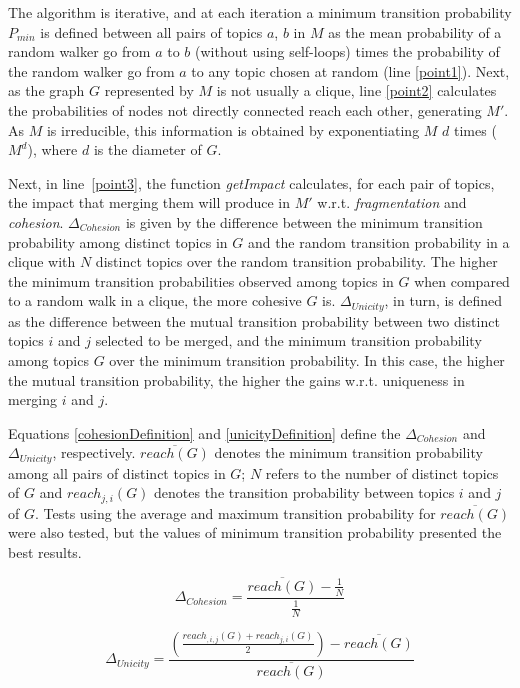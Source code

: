 The algorithm is iterative, and at each iteration a minimum transition
probability $P_{min}$ is defined between all pairs of topics $a$, $b$ in $M$
as the mean probability of a random walker go from $a$ to $b$ (without using
self-loops) times the probability of the random walker go from $a$ to any
topic chosen at random (line \ref{point1}).  Next, as the graph $G$
represented by $M$ is not usually a clique, line \ref{point2} calculates the
probabilities of nodes not directly connected reach each other, generating
$M'$. As $M$ is irreducible, this information is obtained by exponentiating
$M$ $d$ times ($M^d$), where $d$ is the diameter of $G$.


Next, in line~\ref{point3}, the function \textit{getImpact} calculates,
for each pair of topics, the impact that merging them will produce in $M'$
w.r.t. \textit{fragmentation} and \textit{cohesion}.  $\Delta_{Cohesion}$ is
given by the difference between the minimum transition probability among distinct
topics in $G$ and the random transition probability in a clique with $N$
distinct topics over the random transition probability.  The higher the minimum
transition probabilities observed among topics in $G$ when compared to a
random walk in a clique, the more cohesive $G$ is.  $\Delta_{Unicity}$, in
turn, is defined as the difference between the mutual transition probability
between two distinct topics $i$ and $j$ selected to be merged, and the minimum
transition probability among topics $G$ over the minimum transition probability.
In this case, the higher the mutual transition probability, the higher the
gains w.r.t. uniqueness in merging $i$ and $j$.  

Equations
\ref{cohesionDefinition} and \ref{unicityDefinition} define the
$\Delta_{Cohesion}$ and $\Delta_{Unicity}$, respectively.
$\overline{reach(G)}$ denotes the minimum transition probability among all pairs
of distinct topics in $G$; $N$ refers to the number of distinct topics of $G$
and $reach_{j,i}(G)$ denotes the transition probability between topics $i$ and
$j$ of $G$. Tests using the average and maximum transition probability for $\overline{reach(G)}$ were also tested, but the values of minimum transition probability presented the best results. 
\begin{small}
\begin{equation}
\label{cohesionDefinition}
	\Delta_{Cohesion} = \frac{\overline{reach(G)} - \frac{1}{N}}{\frac{1}{N}}
\end{equation}
 
\begin{equation}
\label{unicityDefinition}
	\Delta_{Unicity} = \frac{ (\frac{reach_{,i,j}(G) + reach_{j,i}(G)}{2}) - \overline{reach(G)} }{\overline{reach(G)}}
\end{equation}
\end{small}


